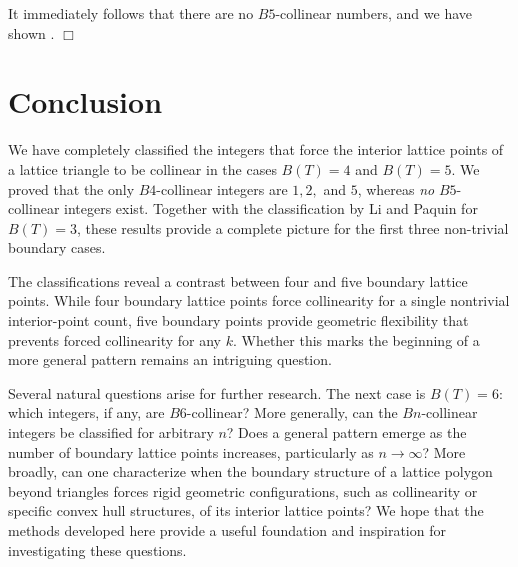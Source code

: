 \documentclass{article}
\theoremstyle{mydefstyle}
\begin{document}
It immediately follows that there are no $B5$-collinear numbers, and we have shown . $\Box$

\section{Conclusion}
We have completely classified the integers that force the interior lattice points of a lattice triangle to be collinear in the cases $B(T)=4$ and $B(T)=5$. We proved that the only $B4$-collinear integers are $1, 2,$ and $5$, whereas \textit{no} $B5$-collinear integers exist. Together with the classification by Li and Paquin for $B(T)=3$, these results provide a complete picture for the first three non-trivial boundary cases.

The classifications reveal a contrast between four and five boundary lattice points. While four boundary lattice points force collinearity for a single nontrivial interior-point count, five boundary points provide geometric flexibility that prevents forced collinearity for any $k$. Whether this marks the beginning of a more general pattern remains an intriguing question.

Several natural questions arise for further research. The next case is $B(T)=6$: which integers, if any, are $B6$-collinear? More generally, can the $Bn$-collinear integers be classified for arbitrary $n$? Does a general pattern emerge as the number of boundary lattice points increases, particularly as $n \to \infty$? More broadly, can one characterize when the boundary structure of a lattice polygon beyond triangles forces rigid geometric configurations, such as collinearity or specific convex hull structures, of its interior lattice points? We hope that the methods developed here provide a useful foundation and inspiration for investigating these questions. 



\end{document}
